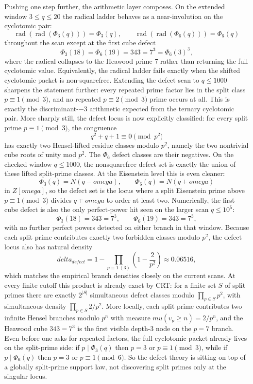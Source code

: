 \documentclass[12pt,a4paper]{article}
\def\mathbb#1{#1}%
\def\mathrm#1{#1}%
\def\omega{omega}%
\def\delta{delta}%
\def\mu{mu}%
\def\Phi#1{Phi#1}%
\theoremstyle{definition}
\begin{document}
Pushing one step further, the arithmetic layer composes. On the extended window $3 \le q \le 20$ the radical ladder behaves as a near-involution on the cyclotomic pair:
\[
\operatorname{rad}(\operatorname{rad}(\Phi_3(q))) = \Phi_3(q), \qquad \operatorname{rad}(\operatorname{rad}(\Phi_6(q))) = \Phi_6(q)
\]
throughout the scan except at the first cube defect
\[
\Phi_3(18) = \Phi_6(19) = 343 = 7^3 = \Phi_6(3)^3,
\]
where the radical collapses to the Heawood prime $7$ rather than returning the full cyclotomic value. Equivalently, the radical ladder fails exactly when the shifted cyclotomic packet is non-squarefree. Extending the defect scan to $q \le 1000$ sharpens the statement further: every repeated prime factor lies in the split class $p \equiv 1 \pmod 3$, and no repeated $p \equiv 2 \pmod 3$ prime occurs at all. This is exactly the discriminant-$-3$ arithmetic expected from the ternary cyclotomic pair.
More sharply still, the defect locus is now explicitly classified: for every split prime $p \equiv 1 \pmod 3$, the congruence
\[
q^2+q+1 \equiv 0 \pmod{p^2}
\]
has exactly two Hensel-lifted residue classes modulo $p^2$, namely the two nontrivial cube roots of unity mod $p^2$. The $\Phi_6$ defect classes are their negatives. On the checked window $q \le 1000$, the nonsquarefree defect set is exactly the union of these lifted split-prime classes.
At the Eisenstein level this is even cleaner:
\[
\Phi_3(q)=N(q-\omega), \qquad \Phi_6(q)=N(q+\omega)
\]
in $\mathbb Z[\omega]$, so the defect set is the locus where a split Eisenstein prime above $p\equiv1\pmod3$ divides $q\mp\omega$ to order at least two.
Numerically, the first cube defect is also the only perfect-power hit seen on the larger scan $q \le 10^5$:
\[
\Phi_3(18)=343=7^3, \qquad \Phi_6(19)=343=7^3,
\]
with no further perfect powers detected on either branch in that window.
Because each split prime contributes exactly two forbidden classes modulo $p^2$, the defect locus also has natural density
\[
\delta_{\mathrm{defect}}=1-\prod_{p\equiv1\ (3)}\left(1-\frac{2}{p^2}\right)\approx0.06516,
\]
which matches the empirical branch densities closely on the current scans.
At every finite cutoff this product is already exact by CRT: for a finite set $S$ of split primes there are exactly $2^{|S|}$ simultaneous defect classes modulo $\prod_{p\in S}p^2$, with simultaneous density $\prod_{p\in S}2/p^2$.
More locally, each split prime contributes two infinite Hensel branches modulo $p^n$ with measure $\mu(v_p\ge n)=2/p^n$, and the Heawood cube $343=7^3$ is the first visible depth-3 node on the $p=7$ branch.
Even before one asks for repeated factors, the full cyclotomic packet already lives on the split-prime side: if $p\mid\Phi_3(q)$ then $p=3$ or $p\equiv1\pmod3$, while if $p\mid\Phi_6(q)$ then $p=3$ or $p\equiv1\pmod6$. So the defect theory is sitting on top of a globally split-prime support law, not discovering split primes only at the singular locus.
\end{document}
